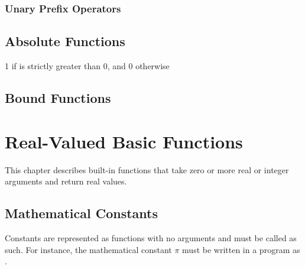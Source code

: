 \subsection{Unary Prefix Operators}

\begin{description}

\end{description}

\section{Absolute Functions}

\begin{description}
%
%
1 if  is strictly greater than 0, and 0 otherwise
%
\end{description}
%

\section{Bound Functions}
%
\begin{description}
%
%
\end{description}


\chapter{Real-Valued Basic Functions}

\noindent
This chapter describes built-in functions that take zero or more real
or integer arguments and return real values.  

\section{Mathematical Constants}\label{built-in-constants.section}

Constants are represented as functions with no arguments and must be
called as such.  For instance, the mathematical constant $\pi$ must be
written in a \Stan program as .

%
\begin{description}
%
%
%
%
%
%
\end{description}

